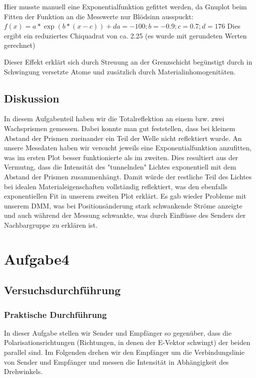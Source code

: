 \documentclass[12pt]{scrartcl}
\begin{document}
Hier musste manuell eine Exponentialfunktion gefittet werden, da Gnuplot beim Fitten der Funktion an die Messwerte nur Blödsinn ausspuckt:
$f(x)= a*\exp(b*(x-c)) +d
a=-100; b=-0.9; c=0.7; d=176$
Dies ergibt ein reduziertes Chiquadrat von ca.
2.25 (es wurde mit gerundeten Werten gerechnet)

Dieser Effekt erklärt sich durch Streuung an der Grenzschicht begünstigt durch in Schwingung versetzte Atome und zusätzlich durch Materialinhomogenitäten.
\subsection{Diskussion}
In diesem Aufgabenteil haben wir die Totalreflektion an einem bzw. zwei Wachsprismen  gemessen. Dabei konnte man gut feststellen, dass bei kleinem Abstand der Prismen zueinander ein Teil der Welle nicht reflektiert wurde. An unsere Messdaten haben wir versucht jeweils eine Exponentialfunktion anzufitten, was im ersten Plot besser funktionierte als im zweiten. Dies resultiert aus der Vermutng, dass die Intensität des "tunnelnden" Lichtes exponentiell mit dem Abstand der Prismen zusammenhängt. Damit würde der restliche Teil des Lichtes bei idealen Materialeigenschaften vollständig reflektiert, was den ebenfalls exponentiellen Fit in unserem zweiten Plot erklärt. Es gab wieder Probleme mit unserem DMM, was bei Positionsänderung stark schwankende Ströme anzeigte und auch während der Messung schwankte, was durch Einflüsse des Senders der Nachbargruppe zu erklären ist.

\section{Aufgabe4}
\subsection{Versuchsdurchführung}
\subsubsection{Praktische Durchführung}
In dieser Aufgabe stellen wir Sender und Empfänger  so gegenüber, dass die Polarisationsrichtungen (Richtungen, in denen der E-Vektor schwingt) der beiden parallel sind. Im Folgenden drehen wir den Empfänger um die Verbindungslinie von Sender und Empfänger und messen die Intensität in Abhängigkeit des Drehwinkels.
\end{document}
